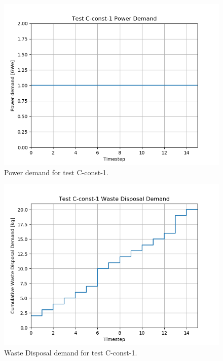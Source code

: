 \documentclass[11pt,letterpaper]{article}
\begin{document}
\begin{figure}[H]
	\begin{center}
		\includegraphics[scale=0.7]{./images/C-const-1.png}
	\end{center}
	\caption{Power demand for test C-const-1.}
	\label{fig:C-const-1}
\end{figure}

\begin{figure}[H]
	\begin{center}
		\includegraphics[scale=0.7]{./images/C-const-1-waste.png}
	\end{center}
	\caption{Waste Disposal demand for test C-const-1.}
	\label{fig:C-const-1-waste}
\end{figure}
\end{document}
